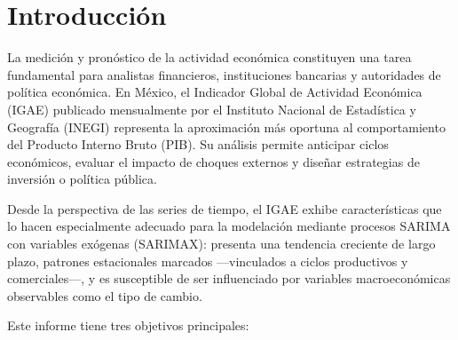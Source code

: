 \documentclass[12pt,a4paper]{article}
\begin{document}
\begin{abstract}
\noindent
El presente informe analiza el Indicador Global de Actividad Económica (IGAE) de México para el período enero 2010 -- diciembre 2023, mediante la estimación de un modelo SARIMAX$(2,1,1)(1,1,1)_{12}$. Se incorpora el tipo de cambio peso-dólar como variable exógena para capturar efectos externos sobre la actividad económica. El modelo es seleccionado a través de los criterios de información AIC y BIC, y su ajuste es evaluado mediante pruebas de diagnóstico sobre los residuales. Los resultados indican que el modelo captura adecuadamente la dinámica estacional de la serie, incluyendo el choque estructural asociado a la pandemia de COVID-19 en 2020. El pronóstico para 2023 presenta un RMSE de 1.58 puntos del índice, con intervalos de confianza al 95\%.

\medskip
\noindent\textbf{Palabras clave:} SARIMAX, IGAE, actividad económica, series de tiempo, México, pronóstico.
\end{abstract}

\tableofcontents
\newpage

\section{Introducción}

La medición y pronóstico de la actividad económica constituyen una tarea fundamental para analistas financieros, instituciones bancarias y autoridades de política económica. En México, el Indicador Global de Actividad Económica (IGAE) publicado mensualmente por el Instituto Nacional de Estadística y Geografía (INEGI) representa la aproximación más oportuna al comportamiento del Producto Interno Bruto (PIB). Su análisis permite anticipar ciclos económicos, evaluar el impacto de choques externos y diseñar estrategias de inversión o política pública.

Desde la perspectiva de las series de tiempo, el IGAE exhibe características que lo hacen especialmente adecuado para la modelación mediante procesos SARIMA con variables exógenas (SARIMAX): presenta una tendencia creciente de largo plazo, patrones estacionales marcados —vinculados a ciclos productivos y comerciales—, y es susceptible de ser influenciado por variables macroeconómicas observables como el tipo de cambio.

Este informe tiene tres objetivos principales:
\end{document}
